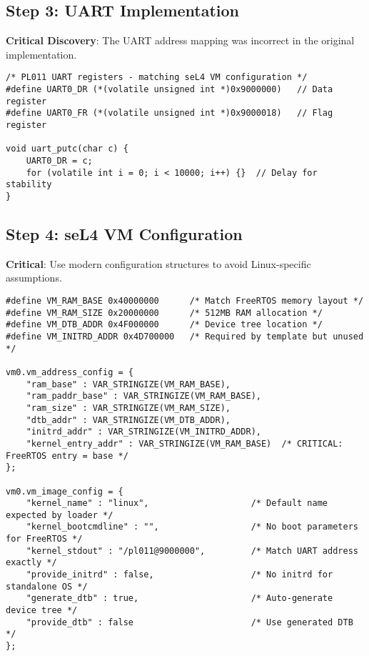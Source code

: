 \documentclass[12pt]{article}
\begin{document}
\subsection{Step 3: UART Implementation}

\textbf{Critical Discovery}: The UART address mapping was incorrect in the original implementation.

\begin{lstlisting}[caption=Correct UART Implementation]
/* PL011 UART registers - matching seL4 VM configuration */
#define UART0_DR (*(volatile unsigned int *)0x9000000)   // Data register  
#define UART0_FR (*(volatile unsigned int *)0x9000018)   // Flag register

void uart_putc(char c) {
    UART0_DR = c;
    for (volatile int i = 0; i < 10000; i++) {}  // Delay for stability
}
\end{lstlisting}

\subsection{Step 4: seL4 VM Configuration}

\textbf{Critical}: Use modern configuration structures to avoid Linux-specific assumptions.

\begin{lstlisting}[caption=devices.camkes - Modern VM Configuration]
#define VM_RAM_BASE 0x40000000      /* Match FreeRTOS memory layout */
#define VM_RAM_SIZE 0x20000000      /* 512MB RAM allocation */
#define VM_DTB_ADDR 0x4F000000      /* Device tree location */
#define VM_INITRD_ADDR 0x4D700000   /* Required by template but unused */

vm0.vm_address_config = {
    "ram_base" : VAR_STRINGIZE(VM_RAM_BASE),
    "ram_paddr_base" : VAR_STRINGIZE(VM_RAM_BASE), 
    "ram_size" : VAR_STRINGIZE(VM_RAM_SIZE),
    "dtb_addr" : VAR_STRINGIZE(VM_DTB_ADDR),
    "initrd_addr" : VAR_STRINGIZE(VM_INITRD_ADDR),
    "kernel_entry_addr" : VAR_STRINGIZE(VM_RAM_BASE)  /* CRITICAL: FreeRTOS entry = base */
};

vm0.vm_image_config = {
    "kernel_name" : "linux",                    /* Default name expected by loader */
    "kernel_bootcmdline" : "",                  /* No boot parameters for FreeRTOS */
    "kernel_stdout" : "/pl011@9000000",         /* Match UART address exactly */
    "provide_initrd" : false,                   /* No initrd for standalone OS */
    "generate_dtb" : true,                      /* Auto-generate device tree */
    "provide_dtb" : false                       /* Use generated DTB */
};
\end{lstlisting}
\end{document}
